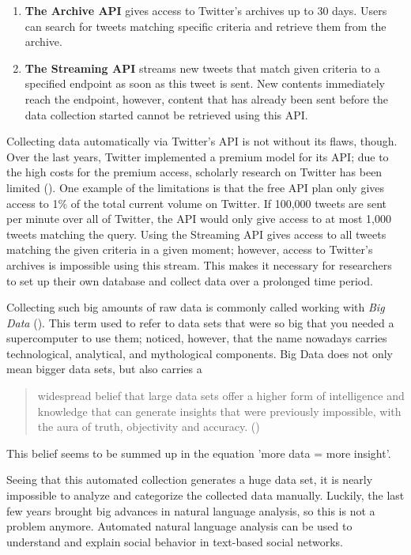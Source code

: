 \begin{enumerate}
    \item \textbf{The Archive API} gives access to Twitter's archives up to 30 days. Users can search for tweets matching specific criteria and retrieve them from the archive.
    \item \textbf{The Streaming API} streams new tweets that match given criteria to a specified endpoint as soon as this tweet is sent. New contents immediately reach the endpoint, however, content that has already been sent before the data collection started cannot be retrieved using this API.
\end{enumerate}

Collecting data automatically via Twitter's API is not without its flaws, though. Over the last years, Twitter implemented a premium model for its API; due to the high costs for the premium access, scholarly research on Twitter has been limited (\cite{brunsTwitterDataWhat2014}). One example of the limitations is that the free API plan only gives access to 1\% of the total current volume on Twitter. If 100,000 tweets are sent per minute over all of Twitter, the API would only give access to at most 1,000 tweets matching the query. Using the Streaming API gives access to all tweets matching the given criteria in a given moment; however, access to Twitter's archives is impossible using this stream. This makes it necessary for researchers to set up their own database and collect data over a prolonged time period.

Collecting such big amounts of raw data is commonly called working with \emph{Big Data} (\cite{crawfordCriticalQuestionsBig2012}). This term used to refer to data sets that were so big that you needed a supercomputer to use them; \citeauthor{crawfordCriticalQuestionsBig2012} noticed, however, that the name nowadays carries technological, analytical, and mythological components. Big Data does not only mean bigger data sets, but also carries a 

\begin{quote}
    widespread belief that large data sets offer a higher form of intelligence and knowledge that can generate insights that were previously impossible, with the aura of truth, objectivity and accuracy. (\cite[3]{crawfordCriticalQuestionsBig2012})
\end{quote}

This belief seems to be summed up in the equation 'more data = more insight'.

Seeing that this automated collection generates a huge data set, it is nearly impossible to analyze and categorize the collected data manually. Luckily, the last few years brought big advances in natural language analysis, so this is not a problem anymore. Automated natural language analysis can be used to understand and explain social behavior in text-based social networks.

